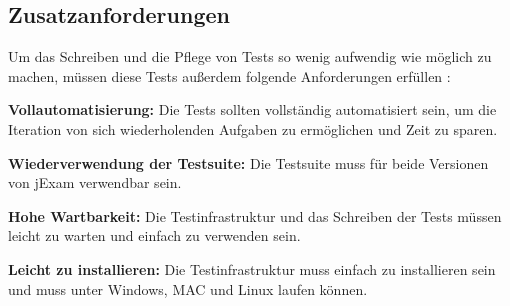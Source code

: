 \subsection{Zusatzanforderungen}

Um das Schreiben und die Pflege von Tests so wenig aufwendig wie m\"oglich
zu machen, m\"ussen diese Tests au{\ss}erdem folgende Anforderungen erf\"ullen :


\textbf{Vollautomatisierung:}  Die Tests sollten vollst\"andig automatisiert sein,
um die Iteration von sich wiederholenden Aufgaben zu erm\"oglichen
und Zeit zu sparen.

\textbf{Wiederverwendung der Testsuite:} Die Testsuite muss f\"ur beide Versionen 
von jExam verwendbar sein.

\textbf{Hohe Wartbarkeit:} Die Testinfrastruktur und das Schreiben der Tests
m\"ussen leicht zu warten und einfach zu verwenden sein.

\textbf{Leicht zu installieren:} Die Testinfrastruktur muss einfach zu installieren sein und muss
unter Windows, MAC und Linux laufen k\"onnen.

